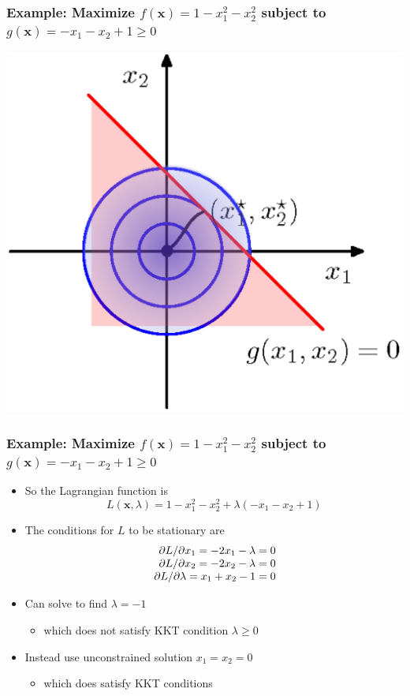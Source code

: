 \documentclass[12pt,notes,mathserif]{beamer}
\begin{document}
\begin{frame}[c]
	\frametitle{Example: Maximize $f(\mathbf{x})=1-x_1^2-x_2^2$ subject to $g(\mathbf{x})=-x_1-x_2+1\geqslant{}0$}
	\begin{center}
		\includegraphics[width=0.65\linewidth]{fig8/lec837.jpg}
	\end{center}
\end{frame}


\begin{frame}[c]
	\frametitle{Example: Maximize $f(\mathbf{x})=1-x_1^2-x_2^2$ subject to $g(\mathbf{x})=-x_1-x_2+1\geqslant{}0$}
	\begin{itemize}
		\item So the Lagrangian function is
		      \[
			      L(\mathbf{x},\lambda)=1-x_1^2-x_2^2+\lambda(-x_1-x_2+1)
		      \]
		\item The conditions for $L$ to be stationary are
		      \[
			      \begin{array}{r@{~}l}
				      \partial L/\partial x_1=-2x_1-\lambda=0 \\
				      \partial L/\partial x_2=-2x_2-\lambda=0 \\
				      \partial L/\partial \lambda=x_1+x_2-1=0 \\
			      \end{array}
		      \]
		\item Can solve to find $\lambda=-1$
		      \begin{itemize}
			      \item which does not satisfy KKT condition $\lambda \geqslant{}0$
		      \end{itemize}
		\item Instead use unconstrained solution $x_1=x_2=0$
		      \begin{itemize}
			      \item which does satisfy KKT conditions
		      \end{itemize}
	\end{itemize}
\end{frame}
\end{document}
